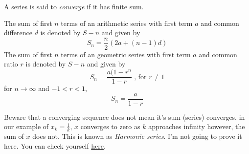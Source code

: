 \vspace{5mm}

\noindent A series is said to \textit{converge} if it has finite sum.

\vspace{5mm}

\noindent The sum of first $n$ terms of an arithmetic series with first term $a$ and common difference $d$ is denoted by $S-n$ and given by
\begin{equation}\label{eq5}
S_n = \frac{n}{2}(2a+(n-1)d)
\end{equation}
\noindent The sum of first $n$ terms of an geometric series with first term $a$ and common ratio $r$ is denoted by $S-n$ and given by
\begin{equation}\label{eq6}
S_n = \frac{a(1-r^n}{1-r} \text{ , for } r \neq 1
\end{equation}
\noindent for $n \to \infty$ and $-1<r<1$,
\begin{equation}\label{eq7}
S_n = \frac{a}{1-r}
\end{equation}

\noindent Beware that a converging sequence does not mean it's sum (series) converges. in our example of $x_k = \frac{1}{k}$, $x$ converges to zero as $k$ approaches infinity however, the sum of $x$ does not. This is known as \textit{Harmonic series}. I'm not going to prove it here. You can check yourself \href{https://proofwiki.org/wiki/Harmonic_Series_is_Divergent}{here}.
